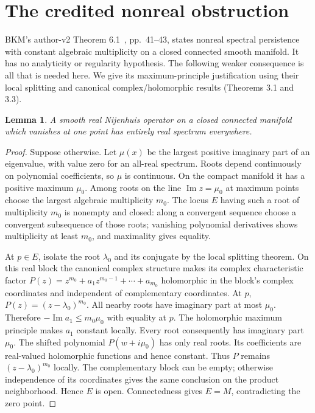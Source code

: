 \documentclass[11pt]{article}
\newtheorem{lemma}{Lemma}
\begin{document}
\section{The credited nonreal obstruction}
BKM's author-v2 Theorem 6.1~\cite{bkm}, pp.~41--43, states nonreal spectral
persistence with constant algebraic multiplicity on a closed connected
smooth manifold. It has no analyticity or regularity hypothesis. The
following weaker consequence is all that is needed here. We give its
maximum-principle justification using their local splitting and canonical
complex/holomorphic results (Theorems 3.1 and 3.3).

\begin{lemma}\label{lem:zero}
A smooth real Nijenhuis operator on a closed connected manifold which
vanishes at one point has entirely real spectrum everywhere.
\end{lemma}
\begin{proof}
Suppose otherwise. Let $\mu(x)$ be the largest positive imaginary part of
an eigenvalue, with value zero for an all-real spectrum. Roots depend
continuously on polynomial coefficients, so $\mu$ is continuous. On the
compact manifold it has a positive maximum $\mu_0$. Among roots on the
line $\operatorname{Im}z=\mu_0$ at maximum points choose the largest
algebraic multiplicity $m_0$. The locus $E$ having such a root of
multiplicity $m_0$ is nonempty and closed: along a convergent sequence
choose a convergent subsequence of those roots; vanishing polynomial
derivatives shows multiplicity at least $m_0$, and maximality gives equality.

At $p\in E$, isolate the root $\lambda_0$ and its conjugate by the local
splitting theorem. On this real block the canonical complex structure
makes its complex characteristic factor
$P(z)=z^{m_0}+a_1z^{m_0-1}+\cdots+a_{m_0}$ holomorphic in the block's
complex coordinates and independent of complementary coordinates. At $p$,
$P(z)=(z-\lambda_0)^{m_0}$. All nearby roots have imaginary part at most
$\mu_0$. Therefore $-\operatorname{Im}a_1\leq m_0\mu_0$ with equality
at $p$. The holomorphic maximum principle makes $a_1$ constant locally.
Every root consequently has imaginary part $\mu_0$. The shifted polynomial
$P(w+i\mu_0)$ has only real roots. Its coefficients are real-valued
holomorphic functions and hence constant. Thus $P$ remains
$(z-\lambda_0)^{m_0}$ locally. The complementary block can be empty;
otherwise independence of its coordinates gives the same conclusion on
the product neighborhood. Hence $E$ is open. Connectedness gives $E=M$,
contradicting the zero point.
\end{proof}
\end{document}
